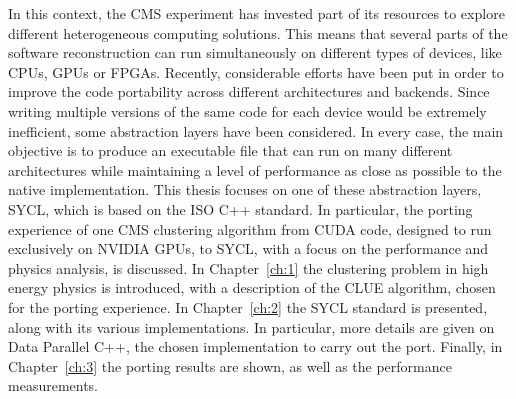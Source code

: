 In this context, the CMS experiment has invested part of its resources to explore different heterogeneous computing solutions. This means that several parts of the software reconstruction can run simultaneously on different types of devices, like CPUs, GPUs or FPGAs. Recently, considerable efforts have been put in order to improve the code portability across different architectures and backends. Since writing multiple versions of the same code for each device would be extremely inefficient, some abstraction layers have been considered. In every case, the main objective is to produce an executable file that can run on many different architectures while maintaining a level of performance as close as possible to the native implementation. \newline
This thesis focuses on one of these abstraction layers, SYCL, which is based on the ISO C++ standard. In particular, the porting experience of one CMS clustering algorithm from CUDA code, designed to run exclusively on NVIDIA GPUs, to SYCL, with a focus on the performance and physics analysis, is discussed. \newline
In Chapter~\ref{ch:1} the clustering problem in high energy physics is introduced, with a description of the CLUE algorithm, chosen for the porting experience. 
In Chapter~\ref{ch:2} the SYCL standard is presented, along with its various implementations. In particular, more details are given on Data Parallel C++, the chosen implementation to carry out the port.
Finally, in Chapter~\ref{ch:3} the porting results are shown, as well as the performance measurements.
